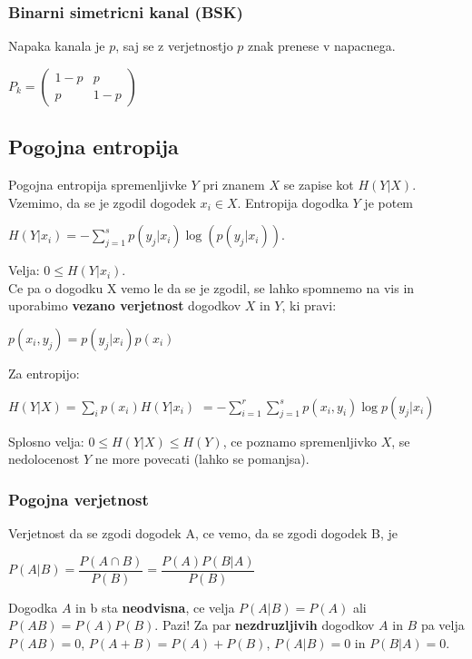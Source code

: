 \documentclass{article}
\begin{document}
\begin{multicols}{4}
\subsubsection{Binarni simetricni kanal (BSK)}
Napaka kanala je $p$, saj se z verjetnostjo $p$ znak prenese v napacnega.
\begin{center}
    \begin{math}
        P_k = 
                \begin{pmatrix}
                    1-p & p\\
                    p & 1-p 
                \end{pmatrix}
    \end{math}
\end{center}

\subsection{Pogojna entropija}
Pogojna entropija spremenljivke $Y$ pri znanem $X$ se zapise kot $H(Y|X)$.
Vzemimo, da se je zgodil dogodek $x_i \in X$. Entropija dogodka $Y$ je potem
\begin{center}
    \begin{math}
        H(Y|x_i) = - \sum_{j=1}^s p(y_j|x_i) \log(p(y_j| x_i)).
    \end{math}
\end{center}
Velja: $0 \leq H(Y| x_i)$.\\
Ce pa o dogodku X vemo le da se je zgodil, se lahko spomnemo na vis in uporabimo
\textbf{vezano verjetnost} dogodkov $X$ in $Y$, ki pravi:
\begin{center}
    \begin{math}
        p(x_i, y_j) = p(y_j|x_i)p(x_i)
    \end{math}
\end{center}
Za entropijo:
\begin{center}
    \begin{math}
        H(Y|X) = \sum_{i} p(x_i)H(Y|x_i)
    \end{math}
    \begin{math}
        = -\sum_{i=1}^r \sum_{j=1}^s p(x_i, y_i) \log p(y_j | x_i)
    \end{math}
\end{center}
Splosno velja: $0 \leq H(Y|X) \leq H(Y)$, ce poznamo spremenljivko $X$, se nedolocenost $Y$ ne more povecati (lahko se pomanjsa).

\subsubsection{Pogojna verjetnost}
Verjetnost da se zgodi dogodek A, ce vemo, da se zgodi dogodek B, je
\begin{center}
    \begin{math}
        P(A | B) = \dfrac{P(A \cap B)}{P(B)} = \dfrac{P(A)P(B|A)}{P(B)}
    \end{math}
\end{center}
Dogodka $A$ in b sta \textbf{neodvisna}, ce velja $P(A | B) = P(A)$ ali
$P(A B) = P(A)P(B)$.
Pazi! Za par \textbf{nezdruzljivih} dogodkov $A$ in $B$
pa velja $P(AB) = 0$,  $P(A + B) = P(A) + P(B)$, $P(A|B) = 0$ in $P(B|A) = 0$.


\end{multicols}
\end{document}
